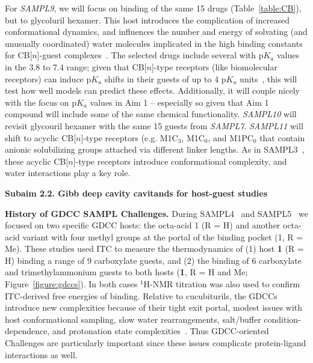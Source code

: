 \documentclass[11pt]{article}
\begin{document}
For \emph{SAMPL9}, we will focus on binding of the same 15 drugs (Table~\ref{table:CB}), but to glycoluril hexamer. 
This host introduces the complication of increased conformational dynamics, and influences the number and energy of solvating (and unusually coordinated) water molecules implicated in the high binding constants for CB[$n$]-guest complexes~\cite{biedermann_release_2012, biedermann_hydrophobic_2014}.  
The selected drugs include several with p$K_a$ values in the 3.8 to 7.4 range; given that CB[$n$]-type receptors (like biomolecular receptors) can induce p$K_a$ shifts in their guests of up to 4 p$K_a$ units~\cite{saleh_activation_2008, nau_deep_2011, ghosh_strategic_2012}, this will test how well models can predict these effects. 
Additionally, it will couple nicely with the focus on p$K_a$ values in Aim 1 -- especially so given that Aim 1 compound will include some of the same chemical functionality.
\emph{SAMPL10} will revisit glycouril hexamer with the same 15 guests from \emph{SAMPL7}.
\emph{SAMPL11} will shift to acyclic CB[$n$]-type receptors (e.g. M1C$_3$, M1C$_0$, and M1PC$_0$ that contain anionic solubilizing groups attached via different linker lengths.  
As in SAMPL3~\cite{muddana_sampl3_2012}, these acyclic CB[$n$]-type receptors introduce conformational complexity, and water interactions play a key role.

\textbf{Subaim 2.2. Gibb deep cavity cavitands for host-guest studies} 

{\bf History of GDCC SAMPL Challenges.} During SAMPL4~\cite{gibb_binding_2013} and SAMPL5~\cite{sullivan_binding_2016} we focused on two specific GDCC hosts: the octa-acid 1 (R = H) and another octa-acid variant with four methyl groups at the portal of the binding pocket (1, R = Me). 
These studies used ITC to measure the thermodynamics of (1) host {\bf 1} (R = H) binding a range of 9 carboxylate guests,
and (2) the binding of 6 carboxylate and trimethylammonium guests to both hosts ({\bf 1}, R = H and Me; Figure~\ref{figure:gdccs}).  
In both cases $^1$H-NMR titration was also used to confirm ITC-derived free energies of binding.  
Relative to cucubiturils, the GDCCs introduce new complexities because of their tight exit portal, modest issues with host conformational sampling, slow water rearrangements, salt/buffer condition-dependence, and protonation state complexities~\cite{Mobley:2017:AnnualReviewofBiophysics, yin_overview_2016}.
Thus GDCC-oriented Challenges are particularly important since these issues complicate protein-ligand interactions as well.
\end{document}
